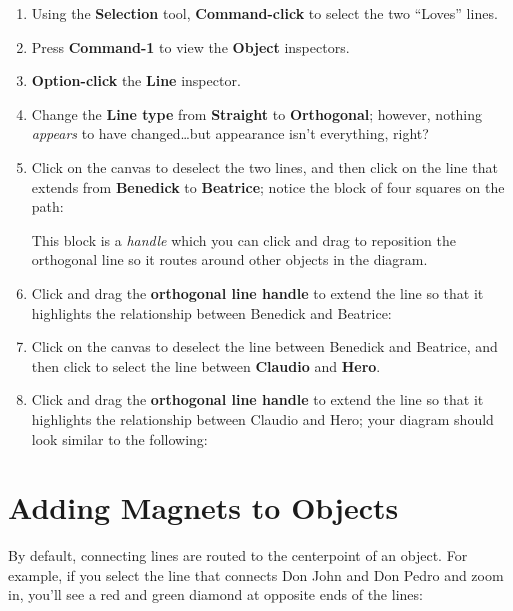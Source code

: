 \documentclass[../main.tex]{subfiles}
\begin{document}
\begin{enumerate}
  \item Using the \textbf{Selection} tool, \textbf{Command-click} to select the two ``Loves''
    lines.
  \item Press \textbf{Command-1} to view the \textbf{Object} inspectors.
  \item \textbf{Option-click} the \textbf{Line} inspector.
  \item Change the \textbf{Line type} from \textbf{Straight} to \textbf{Orthogonal}; however,
    nothing \textit{appears} to have changed\ldots{}but appearance isn't everything, right?

  \item Click on the canvas to deselect the two lines, and then click on the line that extends
    from \textbf{Benedick} to \textbf{Beatrice}; notice the block of four squares on the path:


    This block is a \textit{handle} which you can click and drag to reposition the orthogonal line
    so it routes around other objects in the diagram.
  \item Click and drag the \textbf{orthogonal line handle} to extend the line so that it
    highlights the relationship between Benedick and Beatrice:

  \item Click on the canvas to deselect the line between Benedick and Beatrice, and then click
    to select the line between \textbf{Claudio} and \textbf{Hero}.
  \item Click and drag the \textbf{orthogonal line handle} to extend the line so that it
    highlights the relationship between Claudio and Hero; your diagram should look similar to
    the following:

\end{enumerate}

\section{Adding Magnets to Objects}

By default, connecting lines are routed to the centerpoint of an object. For example, if you
select the line that connects Don John and Don Pedro and zoom in, you'll see a red and green
diamond at opposite ends of the lines:
\end{document}
